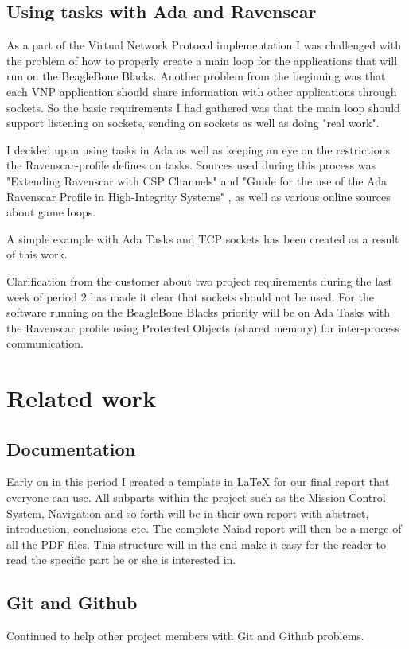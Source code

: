 \subsection{Using tasks with Ada and Ravenscar}
As a part of the Virtual Network Protocol implementation I was challenged with
the problem of how to properly create a main loop for the applications that
will run on the BeagleBone Blacks. Another problem from the beginning was that each
VNP application should share information with other applications through
sockets. So the basic requirements I had gathered was that the main loop should
support listening on sockets, sending on sockets as well as doing "real work".

I decided upon using tasks in Ada as well
as keeping an eye on the restrictions the Ravenscar-profile defines on tasks.
Sources used during this process was "Extending Ravenscar with CSP Channels"
\cite{atiya2005} and "Guide for the use of the Ada Ravenscar Profile in
High-Integrity Systems" \cite{burns2003}, as well as various online sources
about game loops.

A simple example with Ada Tasks and TCP sockets has been created as a result of
this work.

Clarification from the customer about two project requirements during the last
week of period 2 has made it clear that sockets should not be used.
For the software running on the BeagleBone Blacks priority will be on Ada Tasks
with the Ravenscar profile using Protected Objects (shared memory) for
inter-process communication.

\section{Related work}
\subsection{Documentation}
Early on in this period I created a template in LaTeX for our final report
that everyone can use. All subparts within the project such as the Mission Control System,
Navigation and so forth will be in their own report with abstract, introduction,
conclusions etc. The complete Naiad report will then be a merge of all the PDF files.
This structure will in the end make it easy for the reader to read the
specific part he or she is interested in.

\subsection{Git and Github}
Continued to help other project members with Git and Github problems.

